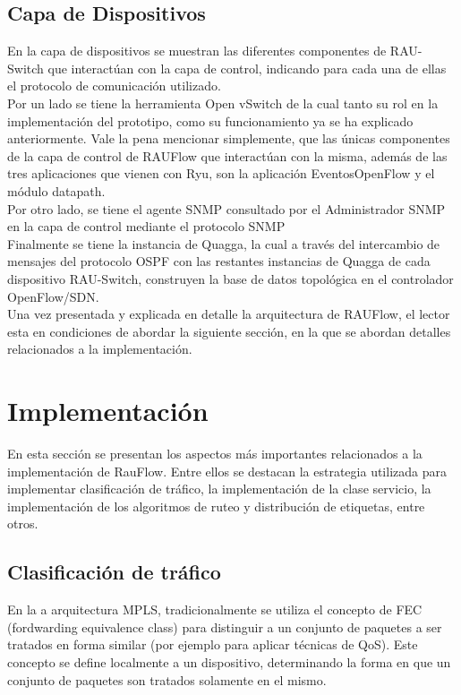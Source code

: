 \subsection{Capa de Dispositivos}
En la capa de dispositivos se muestran las diferentes componentes de RAU-Switch que interact\'uan con la capa de control, indicando para cada una de ellas el protocolo de comunicaci\'on utilizado.\\

Por un lado se tiene la herramienta Open vSwitch de la cual tanto su rol en la implementaci\'on del prototipo, como su funcionamiento ya se ha explicado anteriormente. Vale la pena mencionar simplemente, que las \'unicas componentes de la capa de control de RAUFlow que interact\'uan con la misma, adem\'as de las tres aplicaciones que vienen con Ryu, son la aplicaci\'on EventosOpenFlow y el m\'odulo datapath.\\

Por otro lado, se tiene el agente SNMP consultado por el Administrador SNMP en la capa de control mediante el protocolo SNMP\\

Finalmente se tiene la instancia de Quagga, la cual a través del intercambio de mensajes del protocolo OSPF con las restantes instancias de Quagga de cada dispositivo RAU-Switch, construyen la base de datos topol\'ogica en el controlador OpenFlow/SDN.\\

Una vez presentada y explicada en detalle la arquitectura de RAUFlow, el lector esta en condiciones de abordar la siguiente secci\'on, en la que se abordan detalles relacionados a la implementaci\'on.

\section[Implementaci\'on]{Implementaci\'on}

En esta secci\'on se presentan los aspectos m\'as importantes relacionados a la implementaci\'on de RauFlow. Entre ellos se destacan la estrategia utilizada para implementar clasificaci\'on de tr\'afico,  la implementaci\'on de la clase servicio, la implementaci\'on de los algoritmos de ruteo y distribución de etiquetas, entre otros.\\

\subsection{Clasificación de tr\'afico}
En la a arquitectura MPLS, tradicionalmente se utiliza el concepto de FEC (fordwarding equivalence class) para distinguir a un conjunto de paquetes a ser tratados en forma similar (por ejemplo para aplicar t\'ecnicas de QoS). Este concepto se define localmente a un dispositivo, determinando la forma en que un conjunto de paquetes son tratados solamente en el mismo.

